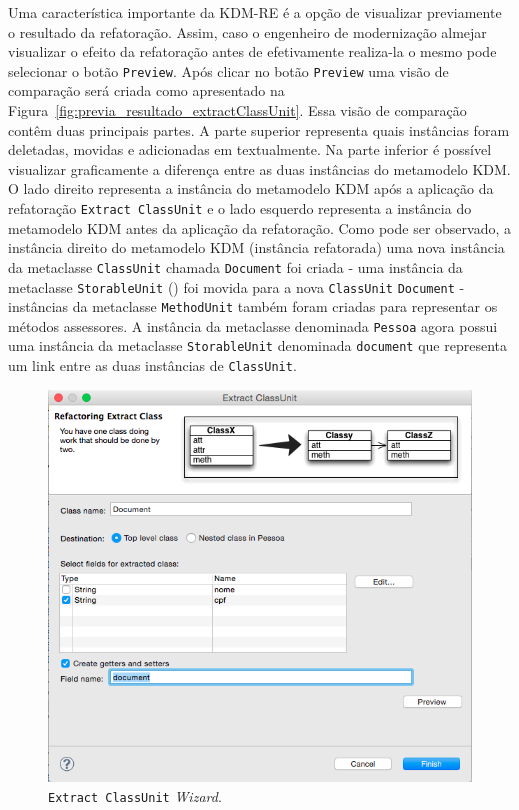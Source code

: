 Uma característica importante da KDM-RE é a opção de visualizar previamente o resultado da refatoração. Assim, caso o engenheiro de modernização almejar visualizar o efeito da refatoração antes de efetivamente realiza-la o mesmo pode selecionar o botão \texttt{Preview}. Após clicar no botão \texttt{Preview} uma visão de comparação será criada como apresentado na Figura~\ref{fig:previa_resultado_extractClassUnit}. Essa visão de comparação contêm duas principais partes. A parte superior representa quais instâncias foram deletadas, movidas e adicionadas em textualmente. Na parte inferior é possível visualizar graficamente a diferença entre as duas instâncias do metamodelo KDM. O lado direito representa a instância do metamodelo KDM após a aplicação da refatoração \texttt{Extract ClassUnit} e o lado esquerdo representa a instância do metamodelo KDM antes da aplicação da refatoração. Como pode ser observado, a instância direito do metamodelo KDM (instância refatorada) uma nova instância da metaclasse \texttt{ClassUnit} chamada \texttt{Document} foi criada - uma instância da metaclasse \texttt{StorableUnit} () foi movida para a nova \texttt{ClassUnit} \texttt{Document} - instâncias da metaclasse \texttt{MethodUnit} também foram criadas para representar os métodos assessores. A instância da metaclasse denominada \texttt{Pessoa} agora possui uma instância da metaclasse \texttt{StorableUnit} denominada \texttt{document} que representa um link entre as duas instâncias de \texttt{ClassUnit}.

\begin{figure}[h]
	\centering
	\caption{\texttt{Extract ClassUnit} \textit{Wizard}.}
	\label{fig:kdm_re_wizard_extract_class}
	\includegraphics[scale=0.5]{images/extractClassEasierToExplainerEMFCOmpare}
	\fautor
\end{figure}

